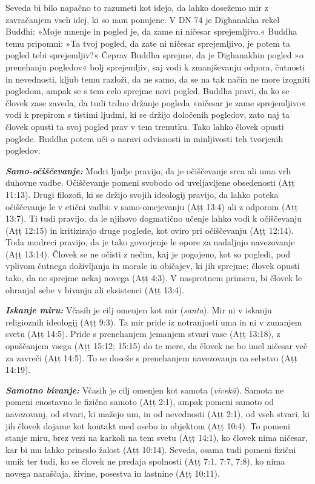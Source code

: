 Seveda bi bilo napačno to razumeti kot idejo, da lahko dosežemo mir z
zavračanjem vseh idej, ki so nam ponujene. V DN 74 je Dīghanakha rekel
Buddhi: »Moje mnenje in pogled je, da zame ni ničesar sprejemljivo.«
Buddha temu pripomni: »Ta tvoj pogled, da zate ni ničesar sprejemljivo,
je potem ta pogled tebi sprejemljiv?« Čeprav Buddha sprejme, da je
Dīghanakhin pogled »o prenehanju pogledov« bolj sprejemljiv, saj vodi k
zmanjševanju odpora, čutnosti in nevednosti, kljub temu razloži, da ne
samo, da se na tak način ne more izogniti pogledom, ampak se s tem celo
sprejme novi pogled. Buddha pravi, da ko se človek zase zaveda, da tudi
trdno držanje pogleda »ničesar je zame sprejemljivo« vodi k prepirom s
tistimi ljudmi, ki se držijo določenih pogledov, zato naj ta človek
opusti ta svoj pogled prav v tem trenutku. Tako lahko človek opusti
poglede. Buddha potem uči o naravi odvisnosti in minljivosti teh
tvorjenih pogledov.

\textbf{\emph{Samo-očiščevanje:} }Modri ljudje pravijo, da je
očiščevanje srca ali uma vrh duhovne vadbe. Očiščevanje pomeni svobodo
od uveljavljene obsedenosti (Aṭṭ 11:13). Drugi filozofi, ki se držijo
svojih ideologij pravijo, da lahko poteka očiščevanje le v etični vadbi:
v samo-omejevanju (Aṭṭ 13:4) ali z odporom (Aṭṭ 13:7). Ti tudi pravijo,
da le njihovo dogmatično učenje lahko vodi k očiščevanju (Aṭṭ 12:15) in
kritizirajo druge poglede, kot oviro pri očiščevanju (Aṭṭ 12:14). Toda
modreci pravijo, da je tako govorjenje le opore za nadaljnjo navezovanje
(Aṭṭ 13:14). Človek se ne očisti z nečim, kaj je pogojeno, kot so
pogledi, pod vplivom čutnega doživljanja in morale in običajev, ki jih
sprejme; človek opusti tako, da ne sprejme nekaj novega (Aṭṭ 4:3). V
nasprotnem primeru, bi človek le ohranjal sebe v bivanju ali eksistenci
(Aṭṭ 13:4).

\textbf{\emph{Iskanje miru:} }Včasih je cilj omenjen kot mir
(\emph{santa}). Mir ni v iskanju religioznih ideologij (Aṭṭ 9:3). Ta mir
pride iz notranjosti uma in ni v zunanjem svetu (Aṭṭ 14:5). Pride s
prenehanjem jemanjem stvari vase (Aṭṭ 13:18), z opuščanjem vsega (Aṭṭ
15:12; 15:15) do te mere, da človek ne bo imel ničesar več za zavreči
(Aṭṭ 14:5). To se doseže s prenehanjem navezovanja na sebstvo (Aṭṭ
14:19).

\textbf{\emph{Samotno bivanje:} }Včasih je cilj omenjen kot samota
(\emph{vivekā}). Samota ne pomeni enostavno le fizično samoto (Aṭṭ 2:1),
ampak pomeni samoto od navezovanj, od stvari, ki mažejo um, in od
nevednosti (Aṭṭ 2:1), od vseh stvari, ki jih človek dojame kot kontakt
med osebo in objektom (Aṭṭ 10:4). To pomeni stanje miru, brez vezi na
karkoli na tem svetu (Aṭṭ 14:1), ko človek nima ničesar, kar bi mu lahko
prineslo žalost (Aṭṭ 10:14). Seveda, osama tudi pomeni fizični umik ter
tudi, ko se človek ne predaja spolnosti (Aṭṭ 7:1, 7:7, 7:8), ko nima
novega naraščaja, živine, posestva in lastnine (Aṭṭ 10:11).

